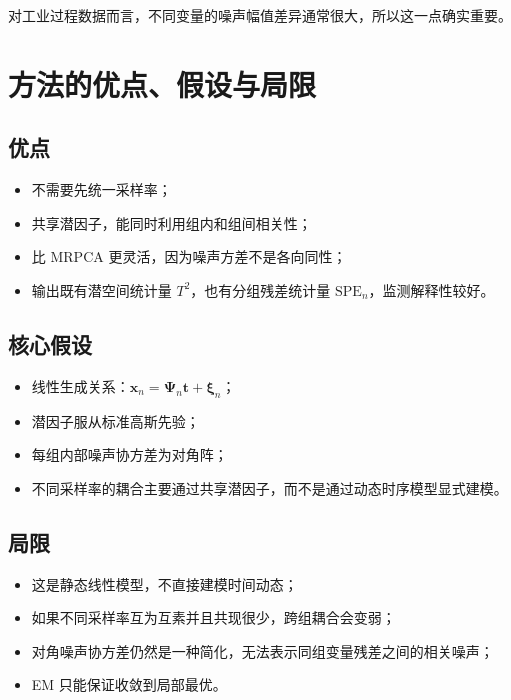 \documentclass[UTF8]{ctexart}
\begin{document}
对工业过程数据而言，不同变量的噪声幅值差异通常很大，所以这一点确实重要。

\section{方法的优点、假设与局限}

\subsection{优点}

\begin{itemize}
    \item 不需要先统一采样率；
    \item 共享潜因子，能同时利用组内和组间相关性；
    \item 比 MRPCA 更灵活，因为噪声方差不是各向同性；
    \item 输出既有潜空间统计量 $T^2$，也有分组残差统计量 $\mathrm{SPE}_n$，监测解释性较好。
\end{itemize}

\subsection{核心假设}

\begin{itemize}
    \item 线性生成关系：$\bm{x}_n=\bm{\Psi}_n\bm{t}+\bm{\xi}_n$；
    \item 潜因子服从标准高斯先验；
    \item 每组内部噪声协方差为对角阵；
    \item 不同采样率的耦合主要通过共享潜因子，而不是通过动态时序模型显式建模。
\end{itemize}

\subsection{局限}

\begin{itemize}
    \item 这是静态线性模型，不直接建模时间动态；
    \item 如果不同采样率互为互素并且共现很少，跨组耦合会变弱；
    \item 对角噪声协方差仍然是一种简化，无法表示同组变量残差之间的相关噪声；
    \item EM 只能保证收敛到局部最优。
\end{itemize}
\end{document}
